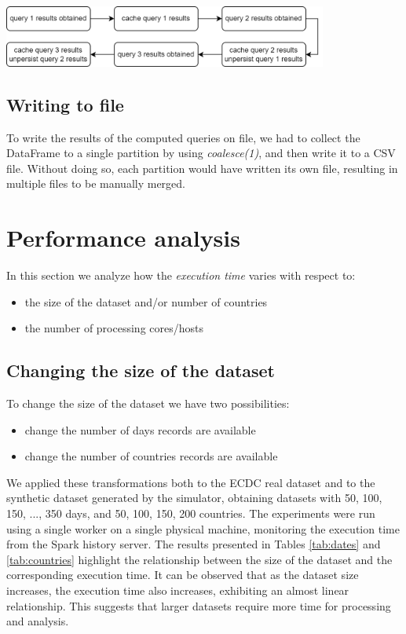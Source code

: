 \documentclass[11pt]{article}
\begin{document}
\begin{center}
    \includegraphics[width=0.8\textwidth]{caching.png}
    \label{fig:caching}
\end{center}

\subsection{Writing to file}
To write the results of the computed queries on file, we had to collect the DataFrame to a single partition by using \textit{coalesce(1)}, and then write it to a CSV file. Without doing so, each partition would have written its own file, resulting in multiple files to be manually merged.

\section{Performance analysis}
In this section we analyze how the \textit{execution time} varies with respect to:
\begin{itemize}
    \item the size of the dataset and/or number of countries
    \item the number of processing cores/hosts
\end{itemize}

\subsection{Changing the size of the dataset}
To change the size of the dataset we have two possibilities:
\begin{itemize}
    \item change the number of days records are available
    \item change the number of countries records are available
\end{itemize}

We applied these transformations both to the ECDC real dataset and to the synthetic dataset generated by the simulator, obtaining datasets with 50, 100, 150, ..., 350 days, and 50, 100, 150, 200 countries. The experiments were run using a single worker on a single physical machine, monitoring the execution time from the Spark history server. The results presented in Tables \ref{tab:dates} and \ref{tab:countries} highlight the relationship between the size of the dataset and the corresponding execution time. It can be observed that as the dataset size increases, the execution time also increases, exhibiting an almost linear relationship. This suggests that larger datasets require more time for processing and analysis.
\end{document}
